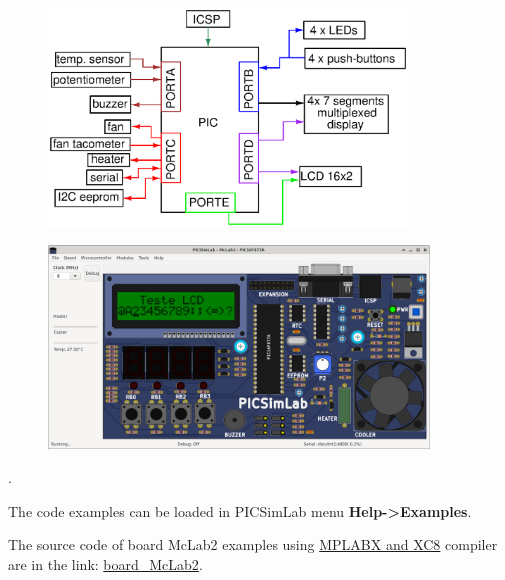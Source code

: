 \begin{figure}[H]
\center
\includegraphics[width=0.85\textwidth]{img/blocks_p3.eps} 
\end{figure} 


\begin{figure}[H]
\center
\includegraphics[width=0.9\textwidth]{img/picsimlab3.png} 
\end{figure} 

.\vspace{0.5cm}

The code examples can be loaded in PICSimLab menu \textbf{Help->Examples}.

The source code of board McLab2 examples using \href{http://www.microchip.com/mplabx}{MPLABX and XC8} 
compiler are in the link: \href{https://lcgamboa.github.io/picsimlab_examples/board_McLab2.html}{board\_McLab2}.




